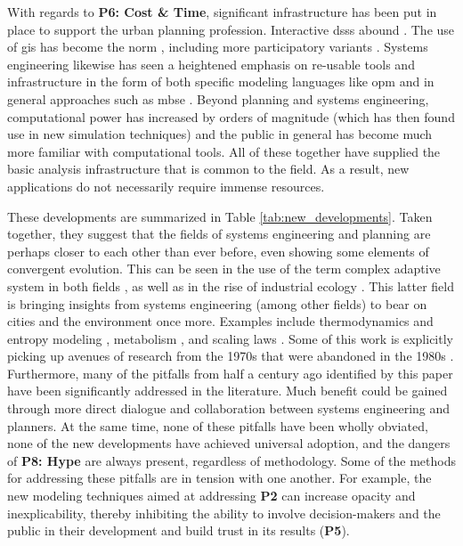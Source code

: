 With regards to \textbf{P6: Cost \& Time}, significant infrastructure has been put in place to support the urban planning profession. Interactive \acp{dss} abound \cite{waddellUrbanSimModelingUrban2002, walkerPlannersGuideCommunityViz2017}. The use of \ac{gis} has become the norm \cite{jankowskiGISGroupDecision2001,tomlinGISCartographicModeling2012,wilsonHandbookGeographicInformation2007}, including more participatory variants \cite{sieberPublicParticipationGeographic2006}. Systems engineering likewise has seen a heightened emphasis on re-usable tools and infrastructure in the form of both specific modeling languages like \ac{opm} \cite{doriObjectProcessMethodologyHolistic2002} and in general approaches such as \ac{mbse} \cite{ramosModelBasedSystemsEngineering2012}. Beyond planning and systems engineering, computational power has increased by orders of magnitude (which has then found use in new simulation techniques) and the public in general has become much more familiar with computational tools. All of these together have supplied the basic analysis infrastructure that is common to the field. As a result, new applications do not necessarily require immense resources.


These developments are summarized in Table \ref{tab:new_developments}. Taken together, they suggest that the fields of systems engineering and planning are perhaps closer to each other than ever before, even showing some elements of convergent evolution. This can be seen in the use of the term complex adaptive system in both fields \cite{yamuAssumingItAll2016}, as well as in the rise of industrial ecology \cite{chertowIndustrialEcologyDeveloping2008}. This latter field is bringing insights from systems engineering (among other fields) to bear on cities and the environment once more. Examples include thermodynamics and entropy modeling \cite{bristowWhyCitiesGrow2015, purvisThermodynamicEntropyIndicator2017}, metabolism \cite{kennedyStudyUrbanMetabolism2011}, and scaling laws \cite{loboUrbanScalingProduction2013}. Some of this work is explicitly picking up avenues of research from the 1970s that were abandoned in the 1980s \cite{kennedyStudyUrbanMetabolism2011}. Furthermore, many of the pitfalls from half a century ago identified by this paper have been significantly addressed in the literature. Much benefit could be gained through more direct dialogue and collaboration between systems engineering and planners. At the same time, none of these pitfalls have been wholly obviated, none of the new developments have achieved universal adoption, and the dangers of \textbf{P8: Hype} are always present, regardless of methodology. Some of the methods for addressing these pitfalls are in tension with one another. For example, the new modeling techniques aimed at addressing \textbf{P2} can increase opacity and inexplicability, thereby inhibiting the ability to involve decision-makers and the public in their development and build trust in its results (\textbf{P5}). 

